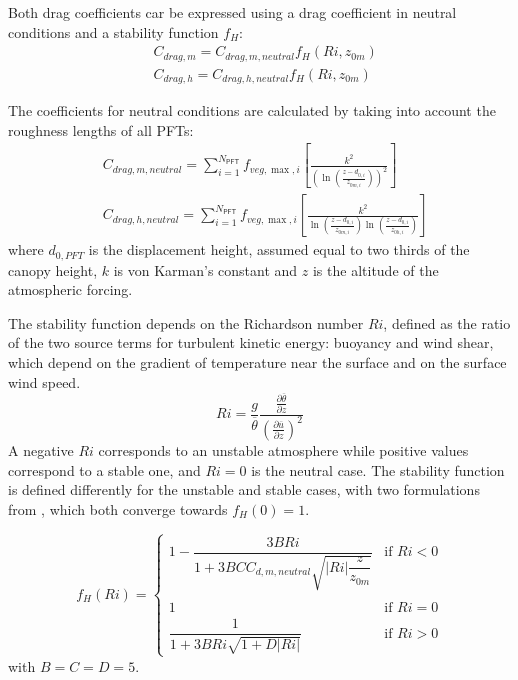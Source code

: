 Both drag coefficients car be expressed using a drag coefficient in neutral conditions and a stability function $f_H$:
\begin{align}
    &C_{drag,m} = C_{drag,m,neutral} f_H(Ri, z_{0m})\\
    &C_{drag,h} = C_{drag,h,neutral} f_H(Ri, z_{0m})
\end{align}

The coefficients for neutral conditions are calculated by taking into account the roughness lengths of all PFTs:
\begin{align}
    &C_{drag,m,neutral} = \sum_{i=1}^{N_\mathsf{PFT}} f_{veg,\max,i} \left[ \frac{k^2}{\left(\ln\left(\frac{z-d_{0,i}}{z_{0m,i}}\right)\right)^2} \right]\\
    &C_{drag,h,neutral} = \sum_{i=1}^{N_\mathsf{PFT}} f_{veg,\max,i} \left[ \frac{k^2}{\ln\left(\frac{z-d_{0,i}}{z_{0m,i}}\right)\ln\left(\frac{z-d_{0,i}}{z_{0h,i}}\right)} \right]
\end{align}
where ${d_{0,PFT}}$ is the displacement height, assumed equal to two thirds of the canopy height, ${k}$ is von Karman's constant and $z$ is the altitude of the atmospheric forcing.

The stability function depends on the Richardson number $Ri$, defined as the ratio of the two source terms for turbulent kinetic energy: buoyancy and wind shear, which depend on the gradient of temperature near the surface and on the surface wind speed. 
\begin{equation}
Ri= \frac{g}{\overline \theta} \frac{\frac{\partial \overline \theta}{\partial z}}{(\frac{\partial \overline u}{ \partial z})^2}
\end{equation}
A negative $Ri$ corresponds to an unstable atmosphere while positive values correspond to a stable one, and $Ri=0$ is the neutral case.
The stability function is defined differently for the unstable and stable cases, with two formulations from \citet{louis_short_1982}, which both converge towards $f_H(0)=1$.

\begin{equation}
f_H(Ri) = 
\begin{cases}
1 - \dfrac{3 B Ri}{1 + 3 B C C_{d,m,neutral} \sqrt{|Ri| \dfrac{z}{z_{0m}}}} & \text{if } Ri < 0 \\
\\
1 & \text{if } Ri=0\\
\dfrac{1}{1 + 3 B Ri \sqrt{1 + D |Ri|}} & \text{if } Ri > 0
\end{cases}
\end{equation}
with $B=C=D=5$.

